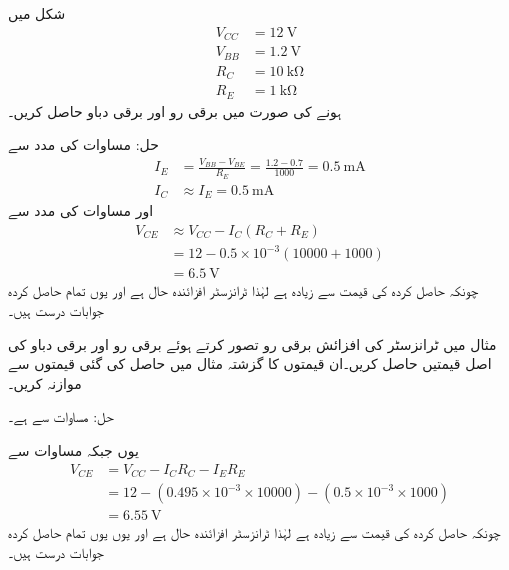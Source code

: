 شکل   میں 
\begin{align*}
V_{CC}&=\SI{12}{\volt} \\
V_{BB}&=\SI{1.2}{\volt} \\
R_C& = \SI{10}{\kilo \ohm}\\
R_E&=\SI{1}{\kilo \ohm}
\end{align*}
ہونے کی صورت میں برقی رو  اور برقی دباو  حاصل کریں۔

حل:	مساوات   کی مدد سے
\begin{align*}
I_E&=\frac{V_{BB}-V_{BE}}{R_E} = \frac{1.2-0.7}{1000}=\SI{0.5}{\milli \ampere}\\
I_C& \approx I_E = \SI{0.5}{\milli \ampere}
\end{align*}
اور مساوات   کی مدد سے
\begin{align*}
V_{CE} & \approx V_{CC}-I_C (R_C+R_E)\\
& =12-0.5 \times 10^{-3} (10000+1000)\\
&=\SI{6.5}{\volt}
\end{align*}
	چونکہ حاصل کردہ  کی قیمت سے زیادہ ہے لہٰذا ٹرانزسٹر افزائندہ حال ہے اور یوں تمام حاصل کردہ جوابات درست ہیں۔


مثال  میں ٹرانزسٹر کی افزائش برقی رو  تصور کرتے ہوئے برقی رو  اور برقی دباو  کی اصل قیمتیں حاصل کریں۔ان قیمتوں کا گزشتہ مثال میں حاصل کی گئی قیمتوں سے موازنہ کریں۔

حل:
	مساوات   سے   ہے۔

یوں جبکہ مساوات    سے
\begin{align*}
V_{CE} &= V_{CC} -I_C R_C - I_E R_E\\
&=12-(0.495 \times 10^{-3} \times 10000)-(0.5 \times 10^{-3} \times 1000)\\
&=\SI{6.55}{\volt}
\end{align*}
چونکہ حاصل کردہ  کی قیمت  سے زیادہ ہے لہٰذا ٹرانزسٹر  افزائندہ حال ہے اور یوں یوں تمام حاصل کردہ جوابات درست ہیں۔


